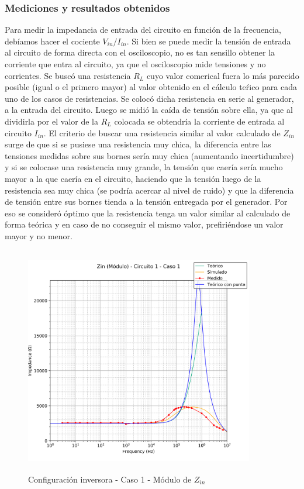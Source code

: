 \subsubsection*{Mediciones y resultados obtenidos} %
Para medir la impedancia de entrada del circuito en funci\'on de la frecuencia, deb\'iamos hacer el cociente $V_{in}/I_{in}$. Si bien se puede medir la tensi\'on de entrada al circuito de forma directa con el osciloscopio, no es tan sensillo obtener la corriente que entra al circuito, ya que el osciloscopio mide tensiones y no corrientes. Se busc\'o una resistencia $R_L$ cuyo valor comerical fuera lo m\'as parecido posible (igual o el primero mayor) al valor obtenido en el c\'alculo te\'rico para cada uno de los casos de resistencias. Se coloc\'o dicha resistencia en serie al generador, a la entrada del circuito. Luego se midi\'o la ca\'ida de tensi\'on sobre ella, ya que al dividirla por el valor de la $R_L$ colocada se obtendr\'ia la corriente de entrada al circuito $I_{in}$. El criterio de buscar una resistencia similar al valor calculado de $Z_{in}$ surge de que si se pusiese una resistencia muy chica, la diferencia entre las tensiones medidas sobre sus bornes ser\'ia muy chica (aumentando incertidumbre) y si se colocase una resistencia muy grande, la tensi\'on que caer\'ia ser\'ia mucho mayor a la que caer\'ia en el circuito, haciendo que la tensi\'on luego de la resistencia sea muy chica (se podr\'ia acercar al nivel de ruido) y que la diferencia de tensi\'on entre sus bornes tienda a la tensi\'on entregada por el generador. Por eso se consider\'o \'optimo que la resistencia tenga un valor similar al calculado de forma te\'orica y en caso de no conseguir el mismo valor, prefiri\'endose un valor mayor y no menor.

\begin{figure}[H] %
	\centering
	\includegraphics[width=10cm,height=10cm,keepaspectratio]{../EJ1/00GRAFICOS/c1c1/c1c1ZINpunta.png}
	\caption{Configuración inversora - Caso 1 - M\'odulo de $Z_{in}$}
	\label{c1c1zinM}
\end{figure}

